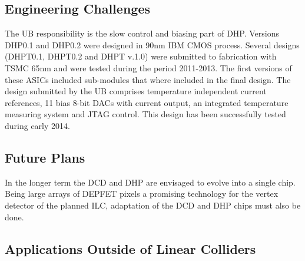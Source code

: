 \subsection{Engineering Challenges}
The UB responsibility is the slow control and biasing part of DHP. Versions DHP0.1 and DHP0.2 were designed in 90nm IBM CMOS process.
Several designs (DHPT0.1, DHPT0.2 and DHPT v.1.0) were submitted to fabrication with TSMC 65nm and were tested during the period 2011-2013. The first versions of these ASICs included sub-modules that where included in the final design. The design submitted by the UB comprises temperature independent current references, 11 bias 8-bit DACs with current output, an integrated temperature measuring system and JTAG control. This design has been successfully tested during early 2014.

\subsection{Future Plans}
In the longer term the DCD and DHP are envisaged to evolve into a single chip. Being large arrays of DEPFET pixels a promising technology for the vertex detector of the planned ILC, adaptation of the DCD and DHP chips must also be done.
\subsection{Applications Outside of Linear Colliders}
